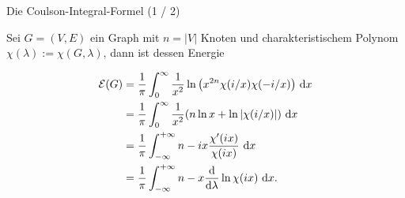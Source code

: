 \documentclass[aspectratio = 169]{beamer}
\begin{document}

\begin{frame}{Die Coulson-Integral-Formel (1 / 2)}
    
    \begin{theorem}

        Sei $G = (V, E)$ ein Graph mit $n = |V|$ Knoten und charakteristischem Polynom $\chi(\lambda) := \chi(G, \lambda)$, dann ist dessen Energie

        \begin{align}
            \mathcal E(G)
            & =
            \frac{1}{\pi}
            \int_0^\infty
                \frac{1}{x^2}
                \ln {\left ( x^{2 n} \chi(i/x) \chi(-i/x) \right )}
                ~ \mathrm d x
            \label{eq:Coulson_1} \\
            & =
            \frac{1}{\pi}
            \int_0^\infty
                \frac{1}{x^2}
                {\left ( 
                    n \ln x
                    +
                    \ln |\chi(i/x)|
                 \right )}
                ~ \mathrm d x
            \label{eq:Coulson_2} \\
            & =
            \frac{1}{\pi}
            \int_{-\infty}^{+\infty}
                n - i x \frac{\chi^\prime(i x)}{\chi(i x)}
                ~ \mathrm d x
            \label{eq:Coulson_3} \\
            & =
            \frac{1}{\pi}
            \int_{-\infty}^{+\infty}
                n - x \frac{\mathrm d}{\mathrm d \lambda} \ln \chi(i x)
                ~ \mathrm d x.
            \label{eq:Coulson_4}
        \end{align}

    \end{theorem}

\end{frame}

\end{document}
